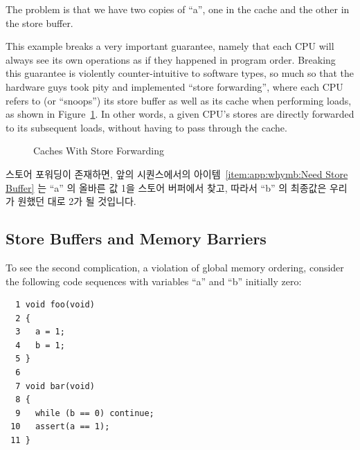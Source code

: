 The problem is that we have two copies of ``a'', one in the cache and
the other in the store buffer.

This example breaks a very important guarantee, namely that each CPU
will always see its own operations as if they happened in program order.
Breaking this guarantee is violently counter-intuitive to software types,
so much so
that the hardware guys took pity and implemented ``store forwarding'',
where each CPU refers to (or ``snoops'') its store buffer as well
as its cache when performing loads, as shown in
Figure~\ref{fig:app:whymb:Caches With Store Forwarding}.
In other words, a given CPU's stores are directly forwarded to its
subsequent loads, without having to pass through the cache.
\fi

\begin{figure}[htb]
\begin{center}
\end{center}
\caption{Caches With Store Forwarding}
\label{fig:app:whymb:Caches With Store Forwarding}
\end{figure}

스토어 포워딩이 존재하면, 앞의 시퀀스에서의 아이템~\ref{item:app:whymb:Need
Store Buffer} 는 ``a'' 의 올바른 값 1을 스토어 버퍼에서 찾고, 따라서 ``b'' 의
최종값은 우리가 원했던 대로 2가 될 것입니다.

\subsection{Store Buffers and Memory Barriers}
\label{sec:app:whymb:Store Buffers and Memory Barriers}

To see the second complication, a violation of global memory ordering,
consider the following code sequences
with variables ``a'' and ``b'' initially zero:

\vspace{5pt}
\begin{minipage}[t]{\columnwidth}
\small
\begin{verbatim}
  1 void foo(void)
  2 {
  3   a = 1;
  4   b = 1;
  5 }
  6
  7 void bar(void)
  8 {
  9   while (b == 0) continue;
 10   assert(a == 1);
 11 }
\end{verbatim}
\end{minipage}
\vspace{5pt}

